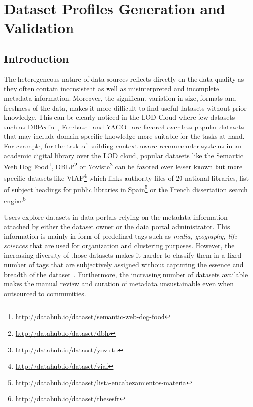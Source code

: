 \chapter{Dataset Profiles Generation and Validation}\label{chapter:roomba}
\graphicspath{{Part1/Chapter2/figures/}}

\section{Introduction}

The heterogeneous nature of data sources reflects directly on the data quality as they often contain inconsistent as well as misinterpreted and incomplete metadata information. Moreover, the significant variation in size, formats and freshness of the data, makes it more difficult to find useful datasets without prior knowledge. This can be clearly noticed in the LOD Cloud where few datasets such as DBPedia~\cite{Bizer:WebSemJorunal:09}, Freebase~\cite{Bollacker:SIGMOD:08} and YAGO~\cite{Suchanek::WWW:07} are favored over less popular datasets that may include domain specific knowledge more suitable for the tasks at hand. For example, for the task of building context-aware recommender systems in an academic digital library over the LOD cloud, popular datasets like the Semantic Web Dog Food\footnote{\url{http://datahub.io/dataset/semantic-web-dog-food}}, DBLP\footnote{\url{http://datahub.io/dataset/dblp}} or Yovisto\footnote{\url{http://datahub.io/dataset/yovisto}} can be favored over lesser known but more specific datasets like VIAF\footnote{\url{http://datahub.io/dataset/viaf}} which links authority files of 20 national libraries, list of subject headings for public libraries in Spain\footnote{\url{http://datahub.io/dataset/lista-encabezamientos-materia}} or the French dissertation search engine\footnote{\url{http://datahub.io/dataset/thesesfr}}.

Users explore datasets in data portals relying on the metadata information attached by either the dataset owner or the data portal administrator. This information is mainly in form of predefined tags such as \textit{media, geography, life sciences} that are used for organization and clustering purposes. However, the increasing diversity of those datasets makes it harder to classify them in a fixed number of tags that are subjectively assigned without capturing the essence and breadth of the dataset~\cite{Lalithsena:WI:13}. Furthermore, the increasing number of datasets available makes the manual review and curation of metadata unsustainable even when outsourced to communities.

